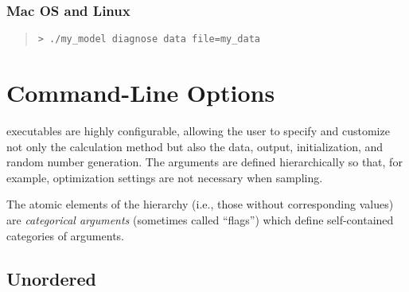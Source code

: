 \subsubsection{Mac OS and Linux}
%
\begin{quote}
\begin{Verbatim}[fontshape=sl]
> ./my_model diagnose data file=my_data
\end{Verbatim}
\end{quote}




\section{Command-Line Options}\label{stan-command-line-options.section}

\Stan executables are highly configurable, allowing the user to specify
and customize not only the calculation method but also the data, output,
initialization, and random number generation.  The arguments are defined
hierarchically so that, for example, optimization settings are not necessary
when sampling.  

The atomic elements of the hierarchy (i.e., those without
corresponding values) are \textit{categorical arguments} (sometimes
called ``flags'') which define self-contained categories of arguments.

\subsection{Unordered}

